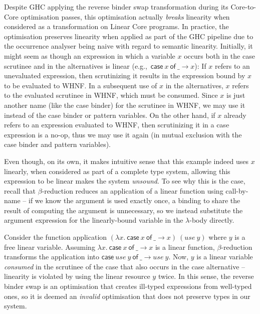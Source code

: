 \documentclass[acmsmall,review,anonymous]{acmart}
\newcommand{\ccase}[2]{\mathsf{case}~#1~\mathsf{of}~#2}
\begin{document}
Despite GHC applying the reverse binder swap transformation 
during its Core-to-Core optimisation passes, this optimisation actually \emph{breaks} linearity
when considered as a transformation on Linear Core programs. In practice, the
optimisation preserves linearity when applied as part of the GHC
pipeline due to the occurrence analyser being naive with
regard to semantic linearity. Initially, it might seem as though an expression
in which a variable $x$ occurs both in the case scrutinee and in the
alternatives is linear (e.g.,~$\ccase{x}{\_ \to x}$):
  If $x$ refers to an unevaluated expression, then scrutinizing it results
in the expression bound by $x$ to be evaluated to WHNF. In a subsequent use of
$x$ in the alternatives, $x$ refers to the evaluated scrutinee in WHNF, which
must be consumed. Since $x$ is just another name (like the case binder) for the
scrutinee in WHNF, we may use it instead of the case binder or pattern
variables.
%
On the other hand, if $x$ already refers to an expression evaluated to WHNF, then
scrutinizing it in a case expression is a no-op, thus we may use it again (in
mutual exclusion with the case binder and pattern variables).
%
%

Even though, on its own, it makes intuitive sense that this example indeed uses
$x$ linearly, when considered as part of a complete type system, allowing this
expression to be linear makes the system \emph{unsound}.
To see why this is the case, recall that $\beta$-reduction reduces an application of a linear function
using call-by-name -- if we know the argument is used exactly once, a binding
to share the result of computing the argument is unnecessary, so we instead
substitute the argument expression for the linearly-bound variable in the
$\lambda$-body directly.

Consider the function application $(\lambda x.~\ccase{x}{\_ \to x})~(use~y)$
where $y$ is a free linear variable. Assuming $\lambda x.~\ccase{x}{\_ \to x}$
is a linear function, $\beta$-reduction transforms the
application into $\ccase{use~y}{\_ \to
  use~y}$. Now, $y$ is a linear variable \emph{consumed} in the scrutinee of the case
that also occurs in the case alternative --
linearity is violated by using the linear resource $y$ twice.
%
In this sense, the reverse binder
swap is an optimisation that creates ill-typed expressions from well-typed
ones, so it is deemed an \emph{invalid} optimisation that does not preserve types in
our system.
\end{document}
